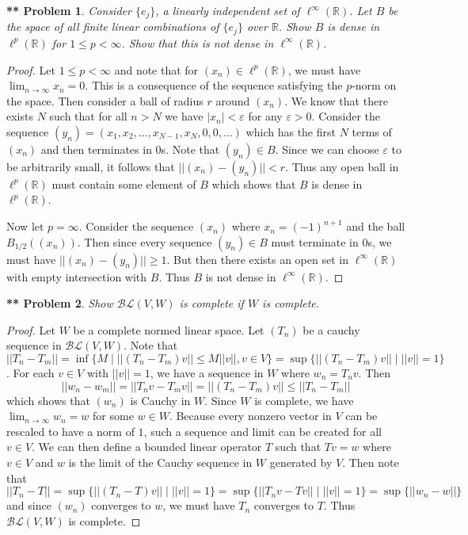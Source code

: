 \documentclass{article}
\newtheorem{**}{** Problem}
\begin{document}
\begin{flushleft}
\begin{**}
Consider $\{e_j\}$, a linearly independent set of $\ell^{\infty} (\mathbb{R})$. Let $B$ be the space of all finite linear combinations of $\{e_j\}$ over $\mathbb{R}$. Show $B$ is dense in $\ell^{p} (\mathbb{R})$ for $1 \leq p < \infty$. Show that this is not dense in $\ell^{\infty} (\mathbb{R})$.
\end{**}
\begin{proof}
Let $1 \leq p < \infty$ and note that for $(x_n) \in \ell^p(\mathbb{R})$, we must have $\lim_{n \rightarrow \infty} x_n = 0$. This is a consequence of the sequence satisfying the $p$-norm on the space. Then consider a ball of radius $r$ around $(x_n)$. We know that there exists $N$ such that for all $n > N$ we have $|x_n| < \varepsilon$ for any $\varepsilon > 0$. Consider the sequence $(y_n) = (x_1, x_2, \dots , x_{N-1}, x_N, 0, 0, \dots )$ which has the first $N$ terms of $(x_n)$ and then terminates in $0$s. Note that $(y_n) \in B$. Since we can choose $\varepsilon$ to be arbitrarily small, it follows that $||(x_n) - (y_n)|| < r$. Thus any open ball in $\ell^p (\mathbb{R})$ must contain some element of $B$ which shows that $B$ is dense in $\ell^p (\mathbb{R})$.\newline

Now let $p = \infty$. Consider the sequence $(x_n)$ where $x_n = (-1)^{n+1}$ and the ball $B_{1/2}((x_n))$. Then since every sequence $(y_n) \in B$ must terminate in $0$s, we must have $||(x_n) - (y_n)|| \geq 1$. But then there exists an open set in $\ell^{\infty} (\mathbb{R})$ with empty intersection with $B$. Thus $B$ is not dense in $\ell^{\infty} (\mathbb{R})$.
\end{proof}

\begin{**}
Show $\mathcal{BL} (V, W)$ is complete if $W$ is complete.
\end{**}
\begin{proof}
Let $W$ be a complete normed linear space. Let $(T_n)$ be a cauchy sequence in $\mathcal{BL} (V, W)$. Note that $||T_n - T_m|| = \inf \{M \mid ||(T_n - T_m)v|| \leq M ||v||, v \in V\} = \sup \{||(T_n - T_m)v|| \mid ||v|| = 1\}$. For each $v \in V$ with $||v|| = 1$, we have a sequence in $W$ where $w_n = T_nv$. Then
\[
||w_n - w_m|| = ||T_nv - T_mv|| = ||(T_n - T_m)v|| \leq ||T_n - T_m||
\]
which shows that $(w_n)$ is Cauchy in $W$. Since $W$ is complete, we have $\lim_{n \rightarrow \infty} w_n = w$ for some $w \in W$. Because every nonzero vector in $V$ can be rescaled to have a norm of $1$, such a sequence and limit can be created for all $v \in V$. We can then define a bounded linear operator $T$ such that $Tv = w$ where $v \in V$ and $w$ is the limit of the Cauchy sequence in $W$ generated by $V$. Then note that
\[
||T_n - T|| = \sup \{||(T_n - T)v|| \mid ||v|| = 1\} = \sup \{||T_nv - Tv|| \mid ||v|| = 1\} = \sup \{||w_n - w||\}
\]
and since $(w_n)$ converges to $w$, we must have $T_n$ converges to $T$. Thus $\mathcal{BL} (V, W)$ is complete.
\end{proof}

\end{flushleft}
\end{document}
